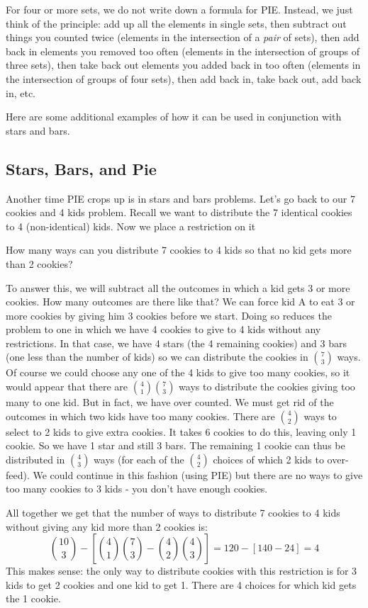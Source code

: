 \documentclass[12pt]{article}
\begin{document}
For four or more sets, we do not write down a formula for PIE.  Instead, we just think of the principle: add up all the elements in single sets, then subtract out things you counted twice (elements in the intersection of a {\em pair} of sets), then add back in elements you removed too often (elements in the intersection of groups of three sets), then take back out elements you added back in too often (elements in the intersection of groups of four sets), then add back in, take back out, add back in, etc.  

Here are some additional examples of how it can be used in conjunction with stars and bars.

\subsection{Stars, Bars, and Pie}

Another time PIE crops up is in stars and bars problems.  Let's go back to our 7 cookies and 4 kids problem.  Recall we want to distribute the 7 identical cookies to 4 (non-identical) kids.  Now we place a restriction on it

\begin{example}
How many ways can you distribute 7 cookies to 4 kids so that no kid gets more than 2 cookies?  

\begin{solution}
To answer this, we will subtract all the outcomes in which a kid gets 3 or more cookies.  How many outcomes are there like that?  We can force kid A to eat 3 or more cookies by giving him 3 cookies before we start.  Doing so reduces the problem to one in which we have 4 cookies to give to 4 kids without any restrictions.  In that case, we have 4 stars (the 4 remaining cookies) and 3 bars (one less than the number of kids) so we can distribute the cookies in ${7 \choose 3}$ ways.  Of course we could choose any one of the 4 kids to give too many cookies, so it would appear that there are ${4 \choose 1}{7 \choose 3}$ ways to distribute the cookies giving too many to one kid.  But in fact, we have over counted.  We must get rid of the outcomes in which two kids have too many cookies.  There are ${4 \choose 2}$ ways to select to 2 kids to give extra cookies.  It takes 6 cookies to do this, leaving only 1 cookie.  So we have 1 star and still 3 bars.  The remaining 1 cookie can thus be distributed in ${4 \choose 3}$ ways (for each of the ${4 \choose 2}$ choices of which 2 kids to over-feed).  We could continue in this fashion (using PIE) but there are no ways to give too many cookies to 3 kids - you don't have enough cookies.

All together we get that the number of ways to distribute 7 cookies to 4 kids without giving any kid more than 2 cookies is:
\[{10 \choose 3} - \left[{4 \choose 1}{7 \choose 3} - {4 \choose 2}{4 \choose 3}\right] = 120 - [ 140 - 24] = 4\]
This makes sense: the only way to distribute cookies with this restriction is for 3 kids to get 2 cookies and one kid to get 1.  There are 4 choices for which kid gets the 1 cookie.
\end{solution}
\end{example}
\end{document}
